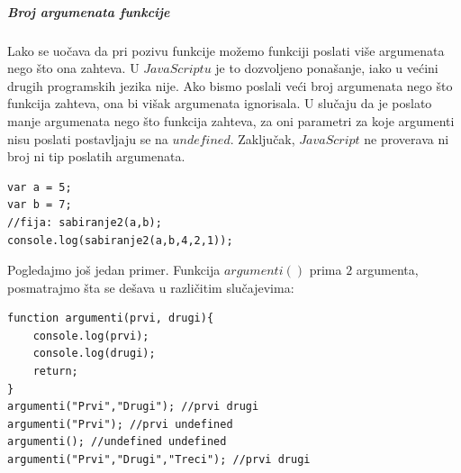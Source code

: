 \documentclass[a4paper]{article}
\begin{document}
\subparagraph{Broj argumenata funkcije}
Lako se uočava da pri pozivu funkcije možemo funkciji poslati više argumenata nego što ona zahteva. U $JavaScriptu$ je to dozvoljeno ponašanje, iako u većini drugih programskih jezika nije. Ako bismo poslali veći broj argumenata nego što funkcija zahteva, ona bi višak argumenata ignorisala. U slučaju da je poslato manje argumenata nego što funkcija zahteva, za oni parametri za koje argumenti nisu poslati postavljaju se na $undefined$. Zaključak, $JavaScript$ ne proverava ni broj ni tip poslatih argumenata.
\begin{lstlisting}[backgroundcolor = \color{lightgray}]
var a = 5;
var b = 7;
//fija: sabiranje2(a,b);
console.log(sabiranje2(a,b,4,2,1));
\end{lstlisting}
Pogledajmo još jedan primer.  Funkcija $argumenti()$ prima $2$ argumenta, posmatrajmo šta se dešava u različitim slučajevima:
\begin{lstlisting}[backgroundcolor = \color{lightgray}]
function argumenti(prvi, drugi){
	console.log(prvi);
	console.log(drugi);
    return;
}
argumenti("Prvi","Drugi"); //prvi drugi
argumenti("Prvi"); //prvi undefined
argumenti(); //undefined undefined
argumenti("Prvi","Drugi","Treci"); //prvi drugi	
\end{lstlisting}
\end{document}
